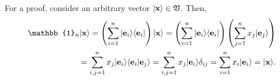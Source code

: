 {\color{OliveGreen}
\bproof

For a proof,  consider an arbitrary vector $\vert {\bf x} \rangle  \in {\frak V}$.
Then,
\begin{equation}
\begin{split}
 \mathbb{1}_n \vert {\bf x} \rangle
 =
\left(\sum_{i=1}^n \vert {\bf e}_i \rangle \langle {\bf e}_i \vert \right)
\vert {\bf x} \rangle
=
\left(\sum_{i=1}^n \vert {\bf e}_i \rangle \langle {\bf e}_i \vert \right)
\left(\sum_{j=1}^n x_j \vert {\bf e}_j  \rangle \right)\\
=
\sum_{i,j=1}^n x_j  \vert  {\bf e}_i \rangle \langle {\bf e}_i \vert {\bf e}_j  \rangle
=
\sum_{i,j=1}^n x_j  \vert {\bf e}_i \rangle \delta_{ij}
=
\sum_{i=1}^n x_i       \vert {\bf e}_i \rangle
=  \vert {\bf x} \rangle
.
\end{split}
\end{equation}
\eproof
}


